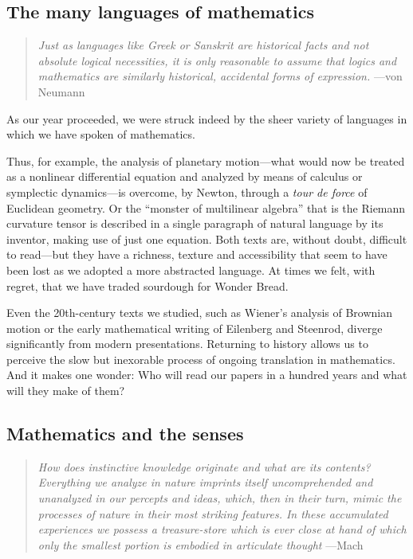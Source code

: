\documentclass{article}
\begin{document}
\subsection{The many languages of mathematics}
 \begin{quote}
     {\em Just as languages like Greek or Sanskrit are historical facts and not absolute logical necessities,
it is only reasonable to assume that logics and mathematics are similarly historical, accidental forms of expression.} ---von Neumann \cite{vonneumann_computer_brain}
 \end{quote}
 As our year proceeded, we were struck indeed by the sheer variety of languages in which we have spoken of mathematics.
 
Thus, for example, the analysis of planetary motion—what would now be treated as a nonlinear differential equation and analyzed by means of calculus or symplectic dynamics—is overcome, by Newton, through a {\em tour de force} of Euclidean geometry. Or the ``monster of multilinear algebra'' that is the Riemann curvature tensor is described in a single paragraph of natural language by its inventor, making use of just one equation. Both texts are, without doubt, difficult to read—but they have a richness, texture and accessibility that seem to have been lost as we adopted a more abstracted language. At times we felt, with regret, that we have traded sourdough for Wonder Bread.

Even the 20th-century texts we studied, such as Wiener’s analysis of Brownian motion or the early mathematical writing of Eilenberg and Steenrod, diverge significantly from modern presentations. Returning to history allows us to perceive the slow but inexorable process of ongoing translation in mathematics. And it makes one wonder: Who will read our papers in a hundred years and what will they make of them?

%
%

%

 

 
  
 

 

%
%
   
%
%
%
%
%
 
  

%
%
%

%
%


 

\subsection{Mathematics and the senses}
\begin{quote}
{\em How does instinctive knowledge originate and what are its contents? Everything we analyze in nature imprints itself {\em uncomprehended\/} and {\em unanalyzed\/} in our percepts and ideas, which, then in their turn, mimic the processes of nature in their most striking features. In these accumulated experiences we possess a treasure-store which is ever close at hand of which only the smallest portion is embodied in articulate thought\/} ---Mach ~\cite{mach_mechanics}
\end{quote}
%
%
\end{document}

